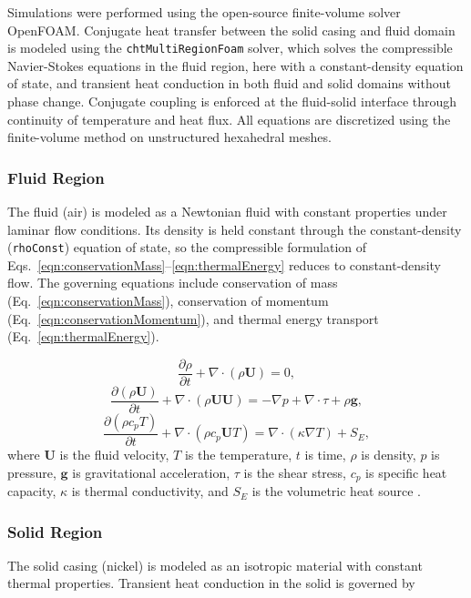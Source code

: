 Simulations were performed using the open-source finite-volume solver OpenFOAM. Conjugate heat transfer between the solid casing and fluid domain is modeled using the \texttt{chtMultiRegionFoam} solver, which solves the compressible Navier-Stokes equations in the fluid region, here with a constant-density equation of state, and transient heat conduction in both fluid and solid domains without phase change. Conjugate coupling is enforced at the fluid-solid interface through continuity of temperature and heat flux. All equations are discretized using the finite-volume method on unstructured hexahedral meshes.

\subsubsection*{Fluid Region}

The fluid (air) is modeled as a Newtonian fluid with constant properties under laminar flow conditions. Its density is held constant through the constant-density (\texttt{rhoConst}) equation of state, so the compressible formulation of Eqs.~\ref{eqn:conservationMass}--\ref{eqn:thermalEnergy} reduces to constant-density flow. The governing equations include conservation of mass (Eq.~\ref{eqn:conservationMass}), conservation of momentum (Eq.~\ref{eqn:conservationMomentum}), and thermal energy transport (Eq.~\ref{eqn:thermalEnergy}).

\begin{equation}\label{eqn:conservationMass}
  \dfrac{\partial \rho}{\partial t} + \nabla \cdot (\rho \mathbf{U}) = 0,
\end{equation}
\begin{equation}\label{eqn:conservationMomentum}
    \frac{\partial (\rho \mathbf{U})}{\partial t} + \nabla \cdot(\rho \mathbf{U} \mathbf{U}) = -\nabla p + \nabla \cdot \tau +\rho \mathbf{g},
\end{equation}
\begin{equation}\label{eqn:thermalEnergy}
   \frac{\partial(\rho c_p T)}{\partial t} + \nabla \cdot (\rho c_p \mathbf{U} T) = \nabla \cdot (\kappa \nabla T) + S_E,
\end{equation}
where $\mathbf{U}$ is the fluid velocity, $T$ is the temperature, $t$ is time, $\rho$ is density, $p$ is pressure, $\mathbf{g}$ is gravitational acceleration, $\tau$ is the shear stress, $c_p$ is specific heat capacity, $\kappa$ is thermal conductivity, and $S_E$ is the volumetric heat source \cite{Batchelor2000,ferziger2002cfd}.

\subsubsection*{Solid Region}
The solid casing (nickel) is modeled as an isotropic material with constant thermal properties. Transient heat conduction in the solid is governed by

